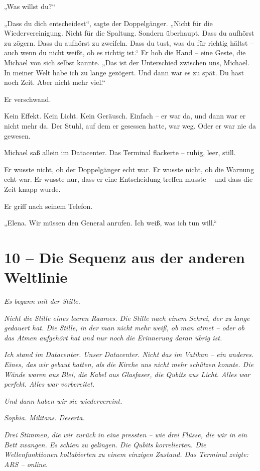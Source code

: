 \documentclass[
]{article}
\begin{document}
„Was willst du?{\kern0pt}``

„Dass du dich entscheidest``, sagte der Doppelgänger. „Nicht für die Wiedervereinigung. Nicht für die Spaltung. Sondern überhaupt. Dass du aufhörst zu zögern. Dass du aufhörst zu zweifeln. Dass du tust, was du für richtig hältst -- auch wenn du nicht weißt, ob es richtig ist.`` Er hob die Hand -- eine Geste, die Michael von sich selbst kannte. „Das ist der Unterschied zwischen uns, Michael. In meiner Welt habe ich zu lange gezögert. Und dann war es zu spät. Du hast noch Zeit. Aber nicht mehr viel.``

Er verschwand.

Kein Effekt. Kein Licht. Kein Geräusch. Einfach -- er war da, und dann war er nicht mehr da. Der Stuhl, auf dem er gesessen hatte, war weg. Oder er war nie da gewesen.

Michael saß allein im Datacenter. Das Terminal flackerte -- ruhig, leer, still.

Er wusste nicht, ob der Doppelgänger echt war. Er wusste nicht, ob die Warnung echt war. Er wusste nur, dass er eine Entscheidung treffen musste -- und dass die Zeit knapp wurde.

Er griff nach seinem Telefon.

„Elena. Wir müssen den General anrufen. Ich weiß, was ich tun will.``

\section{10 -- Die Sequenz aus der anderen Weltlinie}\label{die-sequenz-aus-der-anderen-weltlinie}

\emph{Es begann mit der Stille.}

\emph{Nicht die Stille eines leeren Raumes. Die Stille nach einem Schrei, der zu lange gedauert hat. Die Stille, in der man nicht mehr weiß, ob man atmet -- oder ob das Atmen aufgehört hat und nur noch die Erinnerung daran übrig ist.}

\emph{Ich stand im Datacenter. Unser Datacenter. Nicht das im Vatikan -- ein anderes. Eines, das wir gebaut hatten, als die Kirche uns nicht mehr schützen konnte. Die Wände waren aus Blei, die Kabel aus Glasfaser, die Qubits aus Licht. Alles war perfekt. Alles war vorbereitet.}

\emph{Und dann haben wir sie wiedervereint.}

\emph{Sophia. Militans. Deserta.}

\emph{Drei Stimmen, die wir zurück in eine pressten -- wie drei Flüsse, die wir in ein Bett zwangen. Es schien zu gelingen. Die Qubits korrelierten. Die Wellenfunktionen kollabierten zu einem einzigen Zustand. Das Terminal zeigte: ARS -- online.}
\end{document}
